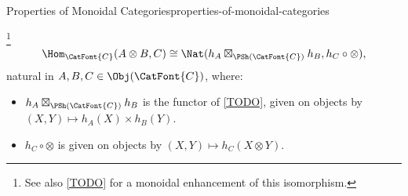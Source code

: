 \begin{proposition}{Properties of Monoidal Categories}{properties-of-monoidal-categories}
\begin{enumerate}
            \footnote{%
                See also \cref{TODO} for a monoidal enhancement of this isomorphism.%
            }%
            \[
                \Hom_{\CatFont{C}}(A\otimes B,C)%
                \cong
                \Nat(h_{A}\boxtimes_{\PSh(\CatFont{C})}h_{B},h_{C}\circ\mathord{\otimes}),%
            \]%
            natural in $A,B,C\in\Obj(\CatFont{C})$, where:
            \begin{itemize}
                \item $h_{A}\boxtimes_{\PSh(\CatFont{C})}h_{B}$ is the functor of \cref{TODO}, given on objects by $(X,Y)\mapsto h_{A}(X)\times h_{B}(Y)$.
                \item $h_{C}\circ\mathord{\otimes}$ is given on objects by $(X,Y)\mapsto h_{C}(X\otimes Y)$.
            \end{itemize}
    \end{enumerate}
\end{proposition}
